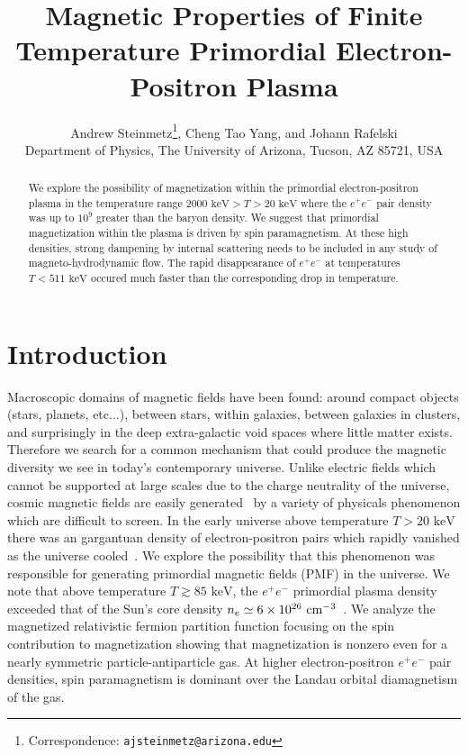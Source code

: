 \documentclass[a4paper]{article}
\title{\boldmath Magnetic Properties of Finite Temperature Primordial Electron-Positron Plasma}
\author{Andrew Steinmetz\orc{\orcC}\thanks{Correspondence: \texttt{ajsteinmetz@arizona.edu}}, Cheng Tao Yang\orc{\orcB}, and Johann Rafelski\orc{\orcA}\\ Department of Physics, The University of Arizona, Tucson, AZ 85721, USA}
\newcommand*{\keV}{\text{ keV}}
\begin{document}
\maketitle

\begin{abstract}
    We explore the possibility of magnetization within the primordial electron-positron plasma in the temperature range $2000\keV>T>20\keV$ where the $e^{+}e^{-}$ pair density was up to $10^{9}$ greater than the baryon density. We suggest that primordial magnetization within the plasma is driven by spin paramagnetism. At these high densities, strong dampening by internal scattering needs to be included in any study of magneto-hydrodynamic flow. The rapid disappearance of $e^{+}e^{-}$ at temperatures $T<511\keV$ occured much faster than the corresponding drop in temperature.
\end{abstract}


\section{Introduction}
\label{sec:introduction}
\noindent Macroscopic domains of magnetic fields have been found: around compact objects (stars, planets, etc...), between stars, within galaxies, between galaxies in clusters, and surprisingly in the deep extra-galactic void spaces where little matter exists. Therefore we search for a common mechanism that could produce the magnetic diversity we see in today's contemporary universe. Unlike electric fields which cannot be supported at large scales due to the charge neutrality of the universe, cosmic magnetic fields are easily generated~\cite{giovannini2003magnetized,kronberg1994extragalactic} by a variety of physicals phenomenon which are difficult to screen. In the early universe above temperature $T>20\keV$ there was an gargantuan density of electron-positron pairs which rapidly vanished as the universe cooled~\cite{rafelski2023short}. We explore the possibility that this phenomenon was responsible for generating primordial magnetic fields (PMF) in the universe. We note that above temperature $T\gtrsim85\keV$, the $e^{+}e^{-}$ primordial plasma density exceeded that of the Sun's core density $n_{e}\simeq6\times10^{26}{\rm\ cm}^{-3}$~\cite{bahcall2001solar}. We analyze the magnetized relativistic fermion partition function focusing on the spin contribution to magnetization showing that magnetization is nonzero even for a nearly symmetric particle-antiparticle gas. At higher electron-positron $e^{+}e^{-}$ pair densities, spin paramagnetism is dominant over the Landau orbital diamagnetism of the gas.
\end{document}
